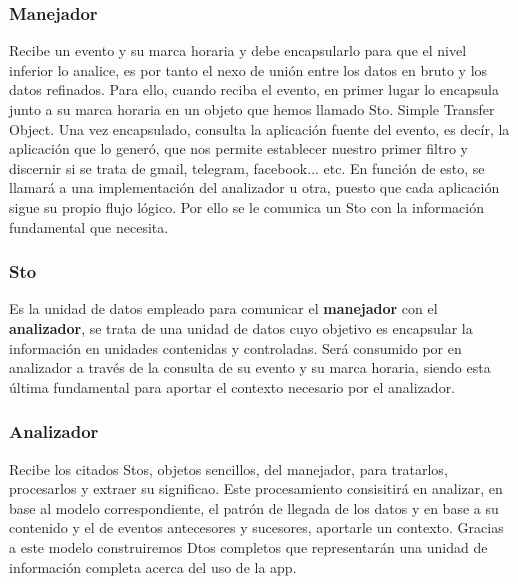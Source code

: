 \documentclass[12pt,a4paper,oneside]{book} %
\begin{document}
\subsubsection{Manejador}
Recibe un evento y su marca horaria y debe encapsularlo para que el nivel inferior lo analice, es por tanto el nexo de unión entre los datos en bruto y los datos refinados. 
\newline
\newline
Para ello, cuando reciba el evento, en primer lugar lo encapsula junto a su marca horaria en un objeto que hemos llamado Sto. Simple Transfer Object. 
\newline
\newline
Una vez encapsulado, consulta la aplicación fuente del evento, es decír, la aplicación que lo generó, que nos permite establecer nuestro primer filtro y discernir si se trata de gmail, telegram, facebook... etc. 
\newline
\newline
En función de esto, se llamará a una implementación del analizador u otra, puesto que cada aplicación sigue su propio flujo lógico. Por ello se le comunica un Sto con la información fundamental que necesita. 
\subsubsection{Sto}
Es la unidad de datos empleado para comunicar el \textbf{manejador} con el \textbf{analizador}, se trata de una unidad de datos cuyo objetivo es encapsular la información en unidades contenidas y controladas. Será consumido por en analizador a través de la consulta de su evento y su marca horaria, siendo esta última fundamental para aportar el contexto necesario por el analizador. 
\subsubsection{Analizador}
Recibe los citados Stos, objetos sencillos, del manejador, para tratarlos, procesarlos y extraer su significao. 
\newline
\newline
Este procesamiento consisitirá en analizar, en base al modelo correspondiente, el patrón de llegada de los datos y en base a su contenido y el de eventos antecesores y sucesores, aportarle un contexto. Gracias a este modelo construiremos Dtos completos que representarán una unidad de información completa acerca del uso de la app.
\end{document}
